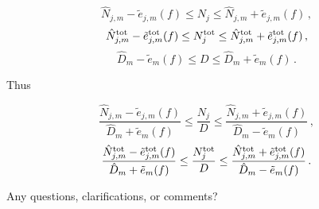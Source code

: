 \documentclass[]{amsart}
\newcommand{\oerr}{e}
\begin{document}
$$\hat{N}_{j,m}-\tilde{\oerr}_{j,m}(f) \leq N_j \leq \hat{N}_{j,m}+\tilde{\oerr}_{j,m}(f)  \, ,$$
$$\hat{N}_{j,m}^{\textup{tot}}-\tilde{\oerr}_{j,m}^{\textup{tot}}(f) \leq N_j^{\textup{tot}} \leq \hat{N}_{j,m}^{\textup{tot}}+\tilde{\oerr}_{j,m}^{\textup{tot}}(f) \, ,$$
$$\hat{D}_{m}-\tilde{\oerr}_{m}(f) \leq D \leq \hat{D}_{m}+\tilde{\oerr}_{m}(f)  \, .$$


Thus

$$\frac{\hat{N}_{j,m}-\tilde{\oerr}_{j,m}(f)}{\hat{D}_{m}+\tilde{\oerr}_{m}(f) } \leq \frac{N_j}{D} \leq \frac{\hat{N}_{j,m}+\tilde{\oerr}_{j,m}(f)}{\hat{D}_{m}-\tilde{\oerr}_{m}(f) }\, ,$$
$$ \frac{\hat{N}_{j,m}^{\textup{tot}}-\tilde{\oerr}_{j,m}^{\textup{tot}}(f) }{\hat{D}_{m}+\tilde{\oerr}_{m}(f)} \leq \frac{N_{j}^{\textup{tot}}}{D} \leq \frac{ \hat{N}_{j,m}^{\textup{tot}}+\tilde{\oerr}_{j,m}^{\textup{tot}}(f)}{\hat{D}_{m}-\tilde{\oerr}_{m}(f)} \, .$$

\bigskip

Any questions, clarifications, or comments?
\end{document}

